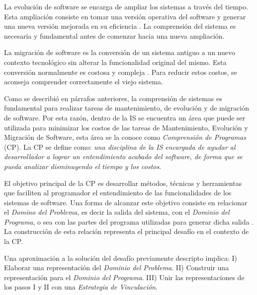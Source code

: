 \documentclass[a4paper,12pt]{article}
\begin{document}
\hspace{0.5cm} La evolución de software se encarga de ampliar los sistemas a través del tiempo. Esta ampliación consiste en tomar una versión operativa del software y generar una nueva versión mejorada en su eficiencia \cite{KBVR00}. La comprensión del sistema es necesaria y fundamental antes de comenzar hacia una nueva ampliación.

\hspace{0.5cm} La migración de software es la conversión de un sistema antiguo a un nuevo contexto tecnológico sin alterar la funcionalidad original del mismo. Esta conversión normalmente es costosa y compleja \cite{MMFAF08}. Para reducir estos costos, se aconseja comprender correctamente el viejo sistema.

\hspace{0.5cm} Como se describió en párrafos anteriores, la comprensión de sistemas es fundamental para realizar tareas de mantenimiento, de evolución y de migración de software.
Por esta razón, dentro de la IS se encuentra un área que puede ser utilizada para minimizar los costos de las tareas de Mantenimiento, Evolución y Migración de Software, esta área se la conoce como \textit{Comprensión de Programas} (CP).
La CP se define como: \textit{una disciplina de la IS encargada de ayudar al
desarrollador a lograr un entendimiento acabado del software, de forma que se pueda analizar disminuyendo el tiempo y los costos}. 

\hspace{0.5cm} El objetivo principal de la CP  \cite{BRM10,MPMR07,MBPHRU10,MAS05} es desarrollar métodos, técnicas y herramientas que faciliten al programador 
el entendimiento de las funcionalidades de los sistemas de software.
Una forma de alcanzar este objetivo consiste en relacionar el \textit{Domino del Problema}, 
es decir la salida del sistema, con el \textit{Dominio del Programa}, o sea 
con las partes del programa utilizadas para generar dicha salida \cite{VMAVA95,MPOB03,BROOK82,AMPM11}.
La construcción de esta relación representa el principal desafío en el contexto de la 
CP. 

\hspace{0.5cm} Una aproximación a la solución del desafío previamente descripto implica:
I) Elaborar una representación del \textit{Dominio del Problema}. II) Construir una representación para el \textit{Dominio del Programa}. III) Unir las representaciones de los pasos I y II con una \textit{Estrategia de Vinculación}.
\end{document}
